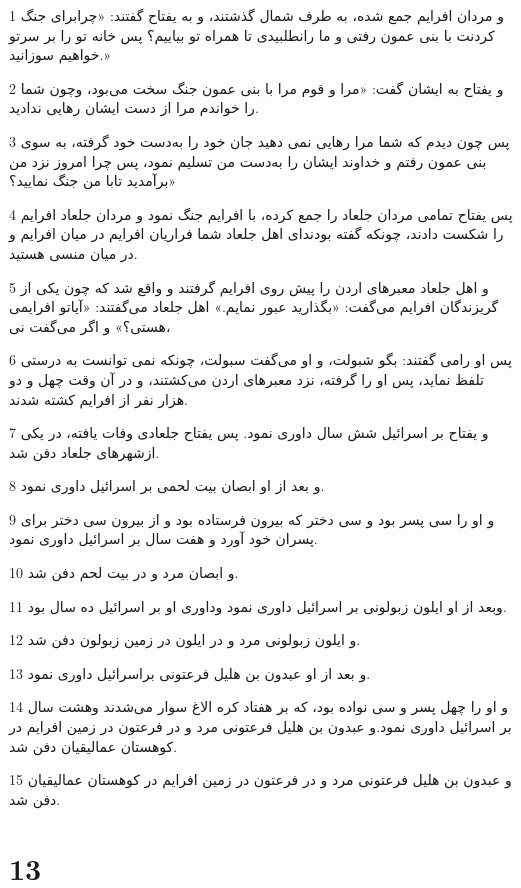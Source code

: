 \par 1 و مردان افرایم جمع شده، به طرف شمال گذشتند، و به یفتاح گفتند: «چرابرای جنگ کردنت با بنی عمون رفتی و ما رانطلبیدی تا همراه تو بیاییم؟ پس خانه تو را بر سرتو خواهیم سوزانید.»
\par 2 و یفتاح به ایشان گفت: «مرا و قوم مرا با بنی عمون جنگ سخت می‌بود، وچون شما را خواندم مرا از دست ایشان رهایی ندادید.
\par 3 پس چون دیدم که شما مرا رهایی نمی دهید جان خود را به‌دست خود گرفته، به سوی بنی عمون رفتم و خداوند ایشان را به‌دست من تسلیم نمود، پس چرا امروز نزد من برآمدید تابا من جنگ نمایید؟»
\par 4 پس یفتاح تمامی مردان جلعاد را جمع کرده، با افرایم جنگ نمود و مردان جلعاد افرایم را شکست دادند، چونکه گفته بودندای اهل جلعاد شما فراریان افرایم در میان افرایم و در میان منسی هستید.
\par 5 و اهل جلعاد معبرهای اردن را پیش روی افرایم گرفتند و واقع شد که چون یکی از گریزندگان افرایم می‌گفت: «بگذارید عبور نمایم.» اهل جلعاد می‌گفتند: «آیاتو افرایمی هستی؟» و اگر می‌گفت نی،
\par 6 پس او رامی گفتند: بگو شبولت، و او می‌گفت سبولت، چونکه نمی توانست به درستی تلفظ نماید، پس او را گرفته، نزد معبرهای اردن می‌کشتند، و در آن وقت چهل و دو هزار نفر از افرایم کشته شدند.
\par 7 و یفتاح بر اسرائیل شش سال داوری نمود. پس یفتاح جلعادی وفات یافته، در یکی ازشهرهای جلعاد دفن شد.
\par 8 و بعد از او ابصان بیت لحمی بر اسرائیل داوری نمود.
\par 9 و او را سی پسر بود و سی دختر که بیرون فرستاده بود و از بیرون سی دختر برای پسران خود آورد و هفت سال بر اسرائیل داوری نمود.
\par 10 و ابصان مرد و در بیت لحم دفن شد.
\par 11 وبعد از او ایلون زبولونی بر اسرائیل داوری نمود وداوری او بر اسرائیل ده سال بود.
\par 12 و ایلون زبولونی مرد و در ایلون در زمین زبولون دفن شد.
\par 13 و بعد از او عبدون بن هلیل فرعتونی براسرائیل داوری نمود.
\par 14 و او را چهل پسر و سی نواده بود، که بر هفتاد کره الاغ سوار می‌شدند وهشت سال بر اسرائیل داوری نمود.و عبدون بن هلیل فرعتونی مرد و در فرعتون در زمین افرایم در کوهستان عمالیقیان دفن شد.
\par 15 و عبدون بن هلیل فرعتونی مرد و در فرعتون در زمین افرایم در کوهستان عمالیقیان دفن شد.
 
\chapter{13}

